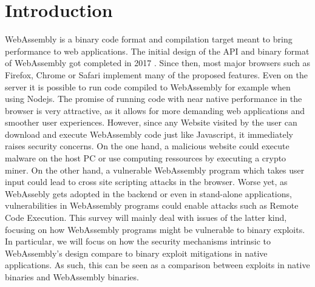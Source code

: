 \documentclass[sigconf]{acmart}
\begin{document}
\maketitle

\section{Introduction}
WebAssembly is a binary code format and compilation target meant to bring performance to web applications.  The initial design of the API and binary format of WebAssembly got completed in 2017 \cite{wasm_roadmap}. Since then, most major browsers such as Firefox, Chrome or Safari implement many of the proposed features. Even on the server it is possible to run code compiled to WebAssembly for example when using Nodejs. The promise of running code with near native performance in the browser is very attractive, as it allows for more demanding web applications and smoother user experiences. However, since any Website visited by the user can download and execute WebAssembly code just like Javascript, it immediately raises security concerns. On the one hand, a malicious website could execute malware on the host PC or use computing ressources by executing a crypto miner. On the other hand, a vulnerable WebAssembly program which takes user input could lead to cross site scripting attacks in the browser. Worse yet, as WebAssebly gets adopted in the backend or even in stand-alone applications, vulnerabilities in WebAssembly programs could enable attacks such as Remote Code Execution. This survey will mainly deal with issues of the latter kind, focusing on how WebAssembly programs might be vulnerable to binary exploits. In particular, we will focus on how the security mechanisms intrinsic to WebAssembly's design compare to binary exploit mitigations in native applications. As such, this can be seen as a comparison between exploits in native binaries and WebAssembly binaries.
\end{document}
